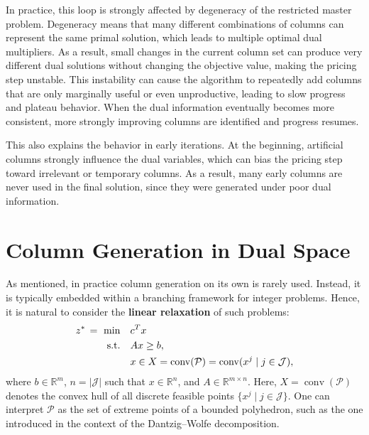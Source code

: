 \documentclass{book}
\theoremstyle{definition}
\newcounter{algorithm_}
\numberwithin{algorithm_}{chapter}
\begin{document}
\medskip

In practice, this loop is strongly affected by degeneracy of the restricted master problem. Degeneracy means that many different combinations of columns can represent the same primal solution, which leads to multiple optimal dual multipliers. As a result, small changes in the current column set can produce very different dual solutions without changing the objective value, making the pricing step unstable. This instability can cause the algorithm to repeatedly add columns that are only marginally useful or even unproductive, leading to slow progress and plateau behavior. When the dual information eventually becomes more consistent, more strongly improving columns are identified and progress resumes.

\medskip

This also explains the behavior in early iterations. At the beginning, artificial columns strongly influence the dual variables, which can bias the pricing step toward irrelevant or temporary columns. As a result, many early columns are never used in the final solution, since they were generated under poor dual information.




\newpage	



\section{Column Generation in Dual Space}

As mentioned, in practice column generation on its own is rarely used. Instead, it is typically embedded within a branching framework for integer problems. Hence, it is natural to consider the \textbf{linear relaxation} of such problems:  
\begin{align} \label{eq:primal_problem}
z^* \, = \ \min \quad & c^T x \notag \\
\text{s.t.} \quad & A x \ge b, \\
& x \in X = \operatorname{conv}(\mathcal{P}) = \operatorname{conv} (x^j \mid j \in \mathcal{J}), \notag
\end{align}
where $b \in \mathbb{R}^m$, $n = |\mathcal{J}|$ such that $x \in \mathbb{R}^n$, and $A \in \mathbb{R}^{m \times n}$. 
Here, $X = \operatorname{conv}(\mathcal{P})$ denotes the convex hull of all discrete feasible points $\{x^j \mid j \in \mathcal{J}\}$. One can interpret $\mathcal{P}$ as the set of extreme points of a bounded polyhedron, such as the one introduced in the context of the Dantzig--Wolfe decomposition.
\end{document}
